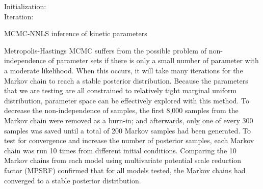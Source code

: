 \begin{algorithm}[H]\vspace{2mm}
 \vspace{2mm}
 Initialization:\\
Iteration:\\
\vspace{2mm}
\caption{MCMC-NNLS inference of kinetic parameters}
\label{MCMCalg}
\end{algorithm}

Metropolis-Hastings MCMC suffers from the possible problem of non-independence of parameter sets if there is only a small number of parameter with a moderate likelihood.  When this occurs, it will take many iterations for the Markov chain to reach a stable posterior distribution.  Because the parameters that we are testing are all constrained to relatively tight marginal uniform distribution, parameter space can be effectively explored with this method.  To decrease the non-independence of samples, the first 8,000 samples from the Markov chain were removed as a burn-in; and afterwards, only one of every 300 samples was saved until a total of 200 Markov samples had been generated.  To test for convergence and increase the number of posterior samples, each Markov chain was run 10 times from different initial conditions.  Comparing the 10 Markov chains from each model using multivariate potential scale reduction factor (MPSRF)\cite{Brooks:1997um} confirmed that for all models tested, the Markov chains had converged to a stable posterior distribution.

